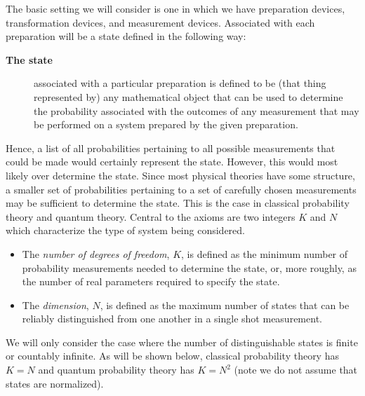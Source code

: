 \documentclass[12pt]{article}
\begin{document}
The basic setting we will consider is one in which we have preparation
devices, transformation devices, and measurement devices. Associated
with each preparation will be a state defined in the following way:
\begin{description}
\item[\bf The state] associated with a particular preparation is
defined to be (that thing represented by) any mathematical object that
can be used to determine the
probability associated with the outcomes of any measurement that may be
performed on a system prepared by the given preparation.
\end{description}
Hence, a list of all probabilities pertaining to all possible measurements that
could be made would certainly represent the state.  However, this would
most likely over determine the state.  Since most physical theories have
some structure, a smaller set of probabilities
pertaining to a set of carefully chosen measurements may be
sufficient to determine the state.  This is the case in
classical probability theory and quantum theory.
Central to the axioms are two integers $K$ and $N$ which
characterize the type of system being considered.
\begin{itemize}
\item The {\it number of degrees of freedom}, $K$, is defined as the
minimum number of probability measurements needed to determine the
state, or, more
roughly, as the number of real parameters required to specify the state.
\item The {\it dimension}, $N$, is defined as the
maximum number of states that can be reliably distinguished from one
another in a single shot measurement.
\end{itemize}
We will only consider the case where the number of distinguishable
states is finite or countably infinite.
As will be shown below, classical probability theory has $K=N$ and quantum
probability theory has $K=N^2$ (note we do not assume that states
are normalized).
\end{document}
